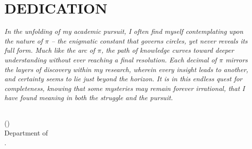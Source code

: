 \chapter*{DEDICATION}
    \def\baselinestretch{1.0}
    \par\textsl{In the unfolding of my academic pursuit, I often find myself contemplating upon the nature of $\pi$ -- the enigmatic constant that governs circles, yet never reveals its full form. Much like the arc of $\pi$, the path of knowledge curves toward deeper understanding without ever reaching a final resolution. Each decimal of $\pi$ mirrors the layers of discovery within my research, wherein every insight leads to another, and certainty seems to lie just beyond the horizon. It is in this endless quest for completeness, knowing that some mysteries may remain forever irrational, that I have found meaning in both the struggle and the pursuit.}
    
    \bigskip\medskip
    \bigskip\medskip
    \bigskip\medskip\bigskip\medskip
    \noindent\\
    \hfill (\authorname)
    \noindent\\
    \hfill Department of \department\\
    \hfill \university.